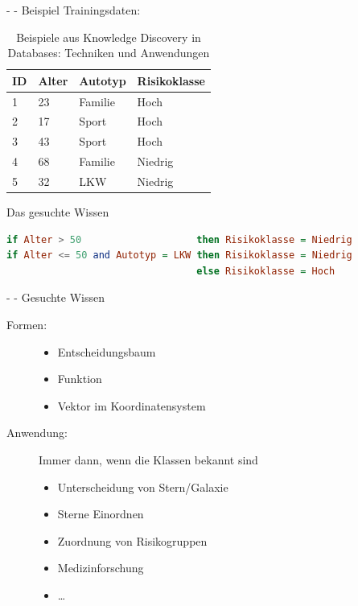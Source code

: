\documentclass[fleqn,11pt,aspectratio=43]{beamer}
\begin{document}
\begin{frame}[fragile]{\insertsectionhead - \insertsubsectionhead - Beispiel \cite{ester2000knowledge}}
Trainingsdaten:
\begin{table}
\begin{tabular}{|p{2cm}|p{2cm}|p{2cm}|p{2cm}|}\hline
ID 	& Alter	& Autotyp	& Risikoklasse \\\hline \hline
1	& 23	& Familie	& Hoch\\
2	& 17	& Sport		& Hoch\\
3	& 43	& Sport		& Hoch\\
4	& 68	& Familie	& Niedrig\\
5	& 32	& LKW		& Niedrig \\\hline
\end{tabular}
\caption{Beispiele aus Knowledge Discovery in Databases: Techniken und Anwendungen \cite{ester2000knowledge}}
\end{table}
\pause
Das gesuchte Wissen
\begin{lstlisting}[language=Haskell]
if Alter > 50                    then Risikoklasse = Niedrig
if Alter <= 50 and Autotyp = LKW then Risikoklasse = Niedrig
                                 else Risikoklasse = Hoch
\end{lstlisting}
\end{frame}

\begin{frame}{\insertsectionhead - \insertsubsectionhead - Gesuchte Wissen \cite{ester2000knowledge}}
\begin{description}
\item[Formen:]
\begin{itemize}
\setlength{\itemsep}{5pt}
\item Entscheidungsbaum %
\item Funktion %
\item Vektor im Koordinatensystem
\end{itemize}
\vspace{0.4em}
\item[Anwendung:] Immer dann, wenn die Klassen bekannt sind \vspace{0.6em}
\begin{itemize}
\setlength{\itemsep}{5pt}
\item Unterscheidung von Stern/Galaxie
\item Sterne Einordnen
\item Zuordnung von Risikogruppen
\item Medizinforschung
\item \dots
\end{itemize}
\end{description}
\end{frame}
\end{document}

